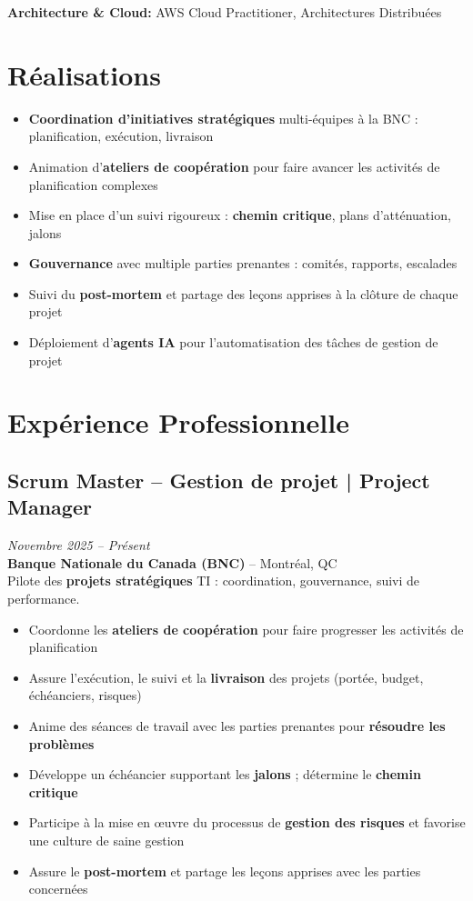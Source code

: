 \documentclass[11pt,a4paper]{article}
\begin{document}
\textbf{Architecture \& Cloud:} AWS Cloud Practitioner, Architectures Distribuées

\vspace{6pt}

\section*{Réalisations}
\begin{itemize}
    \item \textbf{Coordination d'initiatives stratégiques} multi-équipes à la BNC : planification, exécution, livraison
    \item Animation d'\textbf{ateliers de coopération} pour faire avancer les activités de planification complexes
    \item Mise en place d'un suivi rigoureux : \textbf{chemin critique}, plans d'atténuation, jalons
    \item \textbf{Gouvernance} avec multiple parties prenantes : comités, rapports, escalades
    \item Suivi du \textbf{post-mortem} et partage des leçons apprises à la clôture de chaque projet
    \item Déploiement d'\textbf{agents IA} pour l'automatisation des tâches de gestion de projet
\end{itemize}

\section*{Expérience Professionnelle}

\subsection*{Scrum Master -- Gestion de projet | Project Manager} \hfill \textit{Novembre 2025 -- Présent}\\
\textbf{Banque Nationale du Canada (BNC)} -- Montréal, QC\\
Pilote des \textbf{projets stratégiques} TI : coordination, gouvernance, suivi de performance.
\begin{itemize}
    \item Coordonne les \textbf{ateliers de coopération} pour faire progresser les activités de planification
    \item Assure l'exécution, le suivi et la \textbf{livraison} des projets (portée, budget, échéanciers, risques)
    \item Anime des séances de travail avec les parties prenantes pour \textbf{résoudre les problèmes}
    \item Développe un échéancier supportant les \textbf{jalons} ; détermine le \textbf{chemin critique}
    \item Participe à la mise en œuvre du processus de \textbf{gestion des risques} et favorise une culture de saine gestion
    \item Assure le \textbf{post-mortem} et partage les leçons apprises avec les parties concernées
\end{itemize}
\end{document}
